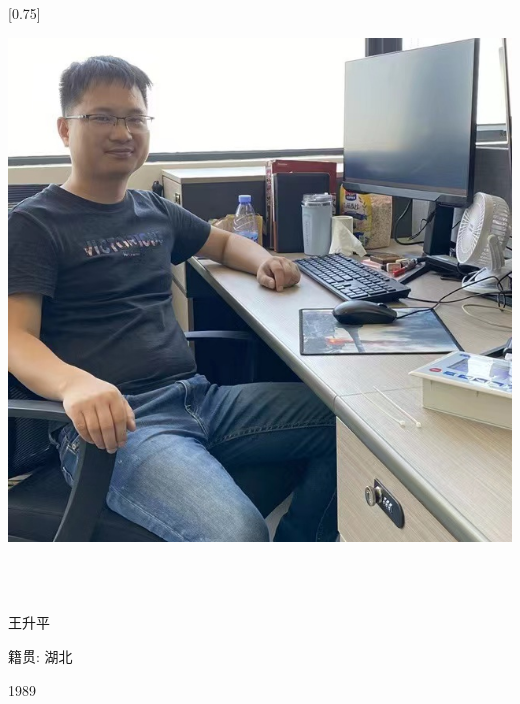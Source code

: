 \documentclass[lighthipster]{simplehipstercv}
\begin{document}
	\setlength{\columnsep}{1.5cm}
	[0.75]
	\begin{paracol}{2}
		
		\paracolbackgroundoptions
		
		
		
		\footnotesize
		{\setasidefontcolour
			\flushright
			\begin{center}
				\includegraphics[width=\linewidth]{ShowMe.jpg}
			\end{center}
			\bigskip
			
			\\[0.5em]
			
			{\footnotesize
				\lorem\lorem\lorem}
			\bigskip
			
			 \\[0.5em]
			王升平
			
			籍贯: 湖北 
			
			1989
			
			\bigskip
			
			 \\[0.5em]
			
}
\end{paracol}
\end{document}
